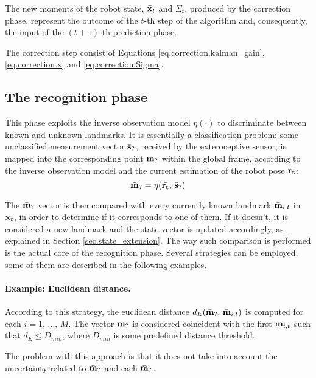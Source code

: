 	The new moments of the robot state, $\bar{\boldsymbol{\mathrm{{x}}}}_t$ and $\Sigma_t$, produced by the correction phase, represent the outcome of the $t$-th step of the \EKF{} algorithm and, consequently, the input of the $(t+1)$-th prediction phase.
	
	\begin{recap}
		The correction step consist of Equations \ref{eq.correction.kalman_gain}, \ref{eq.correction.x} and \ref{eq.correction.Sigma}.
	\end{recap}
	

\subsection{The recognition phase}
	This phase exploits the inverse observation model $\eta(\cdot)$ to discriminate between known and unknown landmarks. 
	It is essentially a classification problem: some unclassified measurement vector $\bar{\boldsymbol{\mathrm{{s}}}}_?$, received by the exteroceptive sensor, is mapped into the corresponding point $\bar{\boldsymbol{\mathrm{{m}}}}_?$ within the global frame, according to the inverse observation model and the current estimation of the robot pose $\bar{\boldsymbol{\mathrm{{r_t}}}}$:
	\[
		\bar{\boldsymbol{\mathrm{{m}}}}_? = \eta(\bar{\boldsymbol{\mathrm{{r_t}}}},\, \bar{\boldsymbol{\mathrm{{s}}}}_?)
	\]
	
	The $\bar{\boldsymbol{\mathrm{{m}}}}_?$ vector is then compared with every currently known landmark $\bar{\boldsymbol{\mathrm{{m}}}}_{i,t}$ in $\bar{\boldsymbol{\mathrm{{x}}}}_t$, in order to determine if it corresponds to one of them. 
	If it doesn't, it is considered a new landmark and the state vector is updated accordingly, as explained in Section \ref{sec.state_extension}.
	The way such comparison is performed is the actual core of the recognition phase. 
	Several strategies can be employed, some of them are described in the following examples.
	
	\paragraph{Example: Euclidean distance.}
		According to this strategy, the euclidean distance $d_E(\bar{\boldsymbol{\mathrm{{m}}}}_?,\,\bar{\boldsymbol{\mathrm{{m}}}}_{i,t})$ is computed for each $i = 1,\, \ldots,\, M$.
		The vector $\bar{\boldsymbol{\mathrm{{m}}}}_?$ is considered coincident with the first $\bar{\boldsymbol{\mathrm{{m}}}}_{i,t}$ such that $d_E \leq D_{min}$, where $D_{min}$ is some predefined distance threshold.
		
		The problem with this approach is that it does not take into account the uncertainty related to $\bar{\boldsymbol{\mathrm{{m}}}}_?$ and each $\bar{\boldsymbol{\mathrm{{m}}}}_?$.
		
